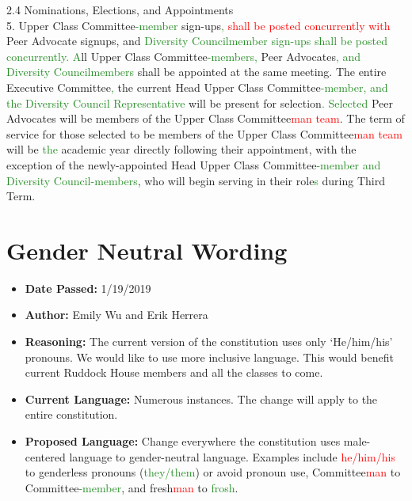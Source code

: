 \documentclass[10pt]{article} %
\begin{document}
\begin{itemize}
	2.4 Nominations, Elections, and Appointments \\
	5. Upper Class Committee\textcolor{ForestGreen}{-member} sign-ups\textcolor{ForestGreen}{,} \textcolor{red}{shall be posted concurrently with} Peer Advocate signups, and \textcolor{ForestGreen}{Diversity Councilmember sign-ups shall be posted concurrently. A}ll Upper Class Committee\textcolor{ForestGreen}{-members, } Peer Advocates\textcolor{ForestGreen}{, and Diversity Councilmembers} shall be appointed at the same meeting. The entire Executive Committee\textcolor{ForestGreen}{,} the current Head Upper Class Committee\textcolor{ForestGreen}{-member, and the Diversity Council Representative} will be present for selection\textcolor{ForestGreen}{. Selected} Peer Advocates will be members of the Upper Class Committee\textcolor{red}{man team}. The term of service for those selected to be members of the Upper Class Committee\textcolor{red}{man team} will be \textcolor{ForestGreen}{the} academic year directly following their appointment, with the exception of the newly-appointed Head Upper Class Committee\textcolor{ForestGreen}{-member and Diversity Council-members}, who will begin serving in their role\textcolor{ForestGreen}{s} during Third Term.
\end{itemize}

\section{Gender Neutral Wording}
\begin{itemize}
	\item \textbf{Date Passed:} 1/19/2019
	\item \textbf{Author:} Emily Wu and Erik Herrera
	\item \textbf{Reasoning:} The current version of the constitution uses only ‘He/him/his’ pronouns. We would like to use more inclusive language. This would benefit current Ruddock House members and all the classes to come. 
	\item \textbf{Current Language:} Numerous instances. The change will apply to the entire constitution.
	\item \textbf{Proposed Language:} Change everywhere the constitution uses male-centered language to gender-neutral language. Examples include \textcolor{red}{he/him/his} to genderless pronouns (\textcolor{ForestGreen}{they/them}) or avoid pronoun use, Committee\textcolor{red}{man} to Committee\textcolor{ForestGreen}{-member}, and fresh\textcolor{red}{man} to \textcolor{ForestGreen}{frosh}. 
\end{itemize}
\end{document}

